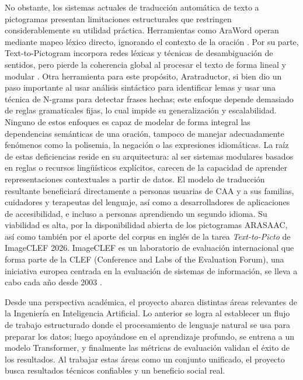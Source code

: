 No obstante, los sistemas actuales de traducción automática de texto a pictogramas presentan limitaciones estructurales que restringen considerablemente su utilidad práctica. Herramientas como AraWord operan mediante mapeo léxico directo, ignorando el contexto de la oración \cite{araword2020}. Por su parte,  Text-to-Pictogram incorpora redes léxicas y técnicas de desambiguación de sentidos, pero pierde la coherencia global al procesar el texto de forma lineal y modular \cite{sevens2015}. Otra herramienta para este propósito, Aratraductor, si bien dio un paso importante al usar análisis sintáctico  para identificar lemas y  usar una técnica de N-grams para detectar frases hechas; este enfoque depende demasiado de reglas gramaticales fijas, lo cual impide su generalización y escalabilidad. Ninguno de estos enfoques es capaz de modelar de forma integral las dependencias semánticas de una oración, tampoco de manejar adecuadamente fenómenos como la polisemia, la negación o las expresiones idiomáticas. La raíz de estas deficiencias reside en su arquitectura: al ser sistemas modulares basados en reglas o recursos lingüísticos explícitos, carecen de la capacidad de aprender representaciones contextuales a partir de datos.
El modelo de traducción resultante beneficiará directamente a personas usuarias de CAA y a sus familias, cuidadores y terapeutas del lenguaje, así como a desarrolladores de aplicaciones de accesibilidad, e incluso a personas aprendiendo un segundo idioma. Su viabilidad es alta,  por la disponibilidad abierta de los pictogramas ARASAAC, así como también por el aporte del corpus en inglés de la tarea \textit{Text-to-Picto} de ImageCLEF 2026. ImageCLEF es un laboratorio de evaluación internacional que forma parte de la CLEF (Conference and Labs of the Evaluation Forum), una iniciativa europea centrada en la evaluación de sistemas de información, se lleva a cabo cada año desde 2003 \cite{unknown-author-no-date2}.

Desde una perspectiva académica, el proyecto abarca distintas áreas relevantes de la Ingeniería en Inteligencia Artificial. Lo anterior se logra al establecer un flujo de trabajo estructurado donde el procesamiento de lenguaje natural se usa para preparar los datos; luego apoyándose en el aprendizaje profundo, se entrena a un modelo Transformer, y finalmente las métricas de evaluación validan el éxito de los resultados. Al trabajar estas áreas como un conjunto unificado, el proyecto busca resultados técnicos confiables y un beneficio social real.

